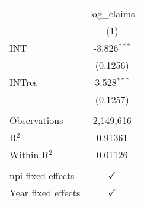 
\begingroup
\centering
\begin{tabular}{lc}
   \toprule
                      & log\_claims\\   
                      & (1)\\  
   \midrule 
   INT                & -3.826$^{***}$\\   
                      & (0.1256)\\   
   INTres             & 3.528$^{***}$\\   
                      & (0.1257)\\   
    \\
   Observations       & 2,149,616\\  
   R$^2$              & 0.91361\\  
   Within R$^2$       & 0.01126\\  
    \\
   npi fixed effects  & $\checkmark$\\   
   Year fixed effects & $\checkmark$\\   
   \bottomrule
\end{tabular}
\par\endgroup


